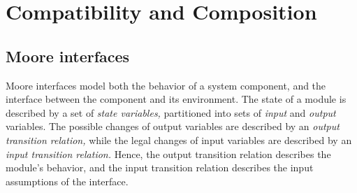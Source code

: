 \section{Compatibility and Composition} 

\subsection{Moore interfaces} 

Moore interfaces model both the behavior of a system component, and
the interface between the component and its environment. 
The state of a module is described by a set of {\em state
variables,} partitioned into sets of {\em input\/} and {\em output\/}
variables. 
The possible changes of output variables are described by an 
{\em output transition relation,} while the legal changes of input
variables are described by an {\em input transition relation.} 
Hence, the output transition relation describes the module's behavior,
and the input transition relation describes the input assumptions of
the interface. 


\begin{comment} 
\begin{figure}
\centering

\hspace{4em}

\caption{\small A counter and a $\pm 1$ adder, modeled as Moore interfaces.
The guarded-command syntax is derived from the one of {\em reactive
modules\/} \cite{RM96journal}.
When more than one guard is true, the command is selected
nondeterministically. 
Input variables not mentioned by the command are updated
nondeterministically.}
\label{fig-counter}
\end{figure}
\end{comment}

